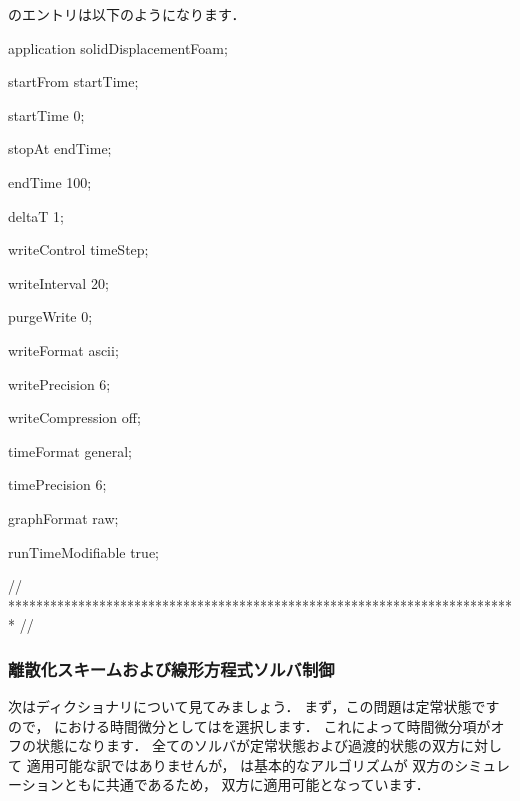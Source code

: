 %
%
のエントリは以下のようになります．
\begin{OFverbatim}[file, linenum=17]

application     solidDisplacementFoam;

startFrom       startTime;

startTime       0;

stopAt          endTime;

endTime         100;

deltaT          1;

writeControl    timeStep;

writeInterval   20;

purgeWrite      0;

writeFormat     ascii;

writePrecision  6;

writeCompression off;

timeFormat      general;

timePrecision   6;

graphFormat     raw;

runTimeModifiable true;


// ************************************************************************* //
\end{OFverbatim}

\subsubsection{離散化スキームおよび線形方程式ソルバ制御}
\label{sssec:2.2.1.5}
次はディクショナリについて見てみましょう．
まず，この問題は定常状態ですので，
における時間微分としてはを選択します．
これによって時間微分項がオフの状態になります．
全てのソルバが定常状態および過渡的状態の双方に対して
適用可能な訳ではありませんが，
は基本的なアルゴリズムが
双方のシミュレーションともに共通であるため，
双方に適用可能となっています．

